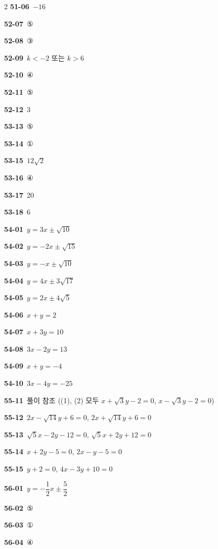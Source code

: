 \documentclass[10pt,a4paper]{article}
\begin{document}
\begin{multicols}{2}
\noindent\textbf{51-06}\ $-16$\par
\noindent\textbf{52-07}\ ⑤\par
\noindent\textbf{52-08}\ ③\par
\noindent\textbf{52-09}\ $k<-2$ 또는 $k>6$\par
\noindent\textbf{52-10}\ ④\par
\noindent\textbf{52-11}\ ⑤\par
\noindent\textbf{52-12}\ 3\par
\noindent\textbf{53-13}\ ⑤\par
\noindent\textbf{53-14}\ ①\par
\noindent\textbf{53-15}\ $12\sqrt{2}$\par
\noindent\textbf{53-16}\ ④\par
\noindent\textbf{53-17}\ 20\par
\noindent\textbf{53-18}\ 6\par
\noindent\textbf{54-01}\ $y=3x\pm\sqrt{10}$\par
\noindent\textbf{54-02}\ $y=-2x\pm\sqrt{15}$\par
\noindent\textbf{54-03}\ $y=-x\pm\sqrt{10}$\par
\noindent\textbf{54-04}\ $y=4x\pm3\sqrt{17}$\par
\noindent\textbf{54-05}\ $y=2x\pm4\sqrt{5}$\par
\noindent\textbf{54-06}\ $x+y=2$\par
\noindent\textbf{54-07}\ $x+3y=10$\par
\noindent\textbf{54-08}\ $3x-2y=13$\par
\noindent\textbf{54-09}\ $x+y=-4$\par
\noindent\textbf{54-10}\ $3x-4y=-25$\par
\noindent\textbf{55-11}\ 풀이 참조 ((1), (2) 모두 $x+\sqrt{3}y-2=0$, $x-\sqrt{3}y-2=0$)\par
\noindent\textbf{55-12}\ $2x-\sqrt{14}y+6=0$, $2x+\sqrt{14}y+6=0$\par
\noindent\textbf{55-13}\ $\sqrt{5}x-2y-12=0$, $\sqrt{5}x+2y+12=0$\par
\noindent\textbf{55-14}\ $x+2y-5=0$, $2x-y-5=0$\par
\noindent\textbf{55-15}\ $y+2=0$, $4x-3y+10=0$\par
\noindent\textbf{56-01}\ $y=-\dfrac{1}{2}x\pm\dfrac{5}{2}$\par
\noindent\textbf{56-02}\ ⑤\par
\noindent\textbf{56-03}\ ①\par
\noindent\textbf{56-04}\ ④\par

\end{multicols}
\end{document}
